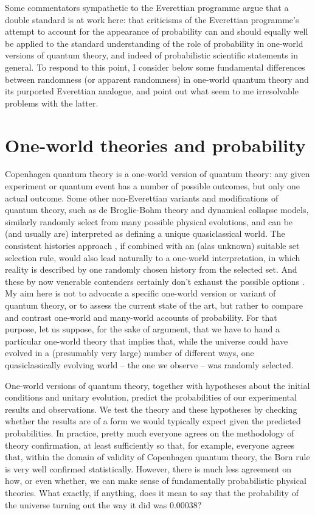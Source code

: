 \documentclass[aps,
pra,epsfig,12pt]{revtex4}
\begin{document}
Some commentators sympathetic to the Everettian programme \cite{greavesmyrvoldvol, papineauvol} 
argue that a double standard is at work here: that criticisms
of the Everettian programme's attempt to account for the appearance
of probability can and should equally well be applied to the
standard understanding of the role of probability in one-world
versions of quantum theory, and indeed of probabilistic scientific
statements in general.   To respond to this point, I consider below
some fundamental differences between 
randomness (or apparent randomness) in one-world quantum theory and 
its purported Everettian analogue, and point out what seem to me
irresolvable problems with the latter.

\section{One-world theories and probability}\label{oneworldprob}

Copenhagen quantum theory is a one-world version of quantum theory:
any given experiment or quantum event has a number of possible
outcomes, but only one actual outcome.  Some other non-Everettian
variants and modifications of quantum theory, such as de Broglie-Bohm
theory and dynamical collapse models, similarly randomly select from
many possible physical evolutions, and can be (and usually are)
interpreted as defining a unique quasiclassical world.  The consistent
histories approach \cite{hartlevol}, if combined with 
an (alas unknown) suitable set
selection rule, would also lead naturally to a one-world
interpretation, in which reality is described by one randomly chosen
history from the selected set.  And these by now venerable contenders
certainly don't exhaust the possible options \cite{akoneworld}.
My aim here is not to advocate a specific one-world version or variant
of quantum theory, or to assess the current state of the art, but
rather to compare and contrast one-world and many-world accounts of
probability.  For that purpose, let us suppose, for the sake of
argument, that we have to hand a particular one-world theory that 
implies that, while the universe could have evolved in a (presumably
very large) number of different ways, one quasiclassically evolving
world -- the one we observe -- was randomly selected.

One-world versions of quantum theory, together with hypotheses about
the initial conditions and unitary evolution, predict the
probabilities of our experimental results and observations.  We test
the theory and these hypotheses by checking whether the results are of
a form we would typically expect given the predicted probabilities.
In practice, pretty much everyone agrees on the methodology of theory
confirmation, at least sufficiently so that, for example, everyone
agrees that, within the domain of validity of Copenhagen quantum
theory, the Born rule is very well confirmed statistically.  However,
there is much less agreement on how, or even whether, we can make
sense of fundamentally probabilistic physical theories.  What exactly, if
anything, does it mean to say that the probability of the universe
turning out the way it did was $0.00038$?
\end{document}
